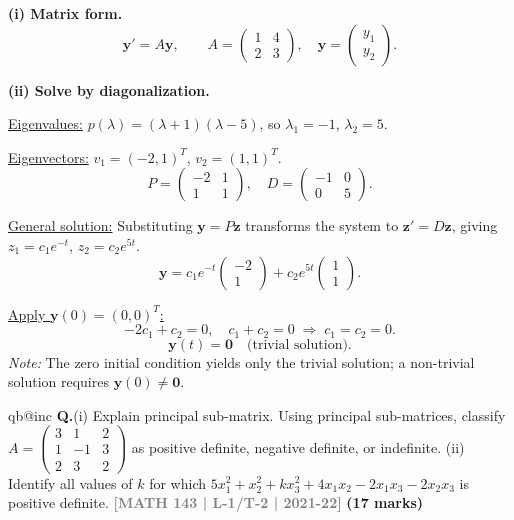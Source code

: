 \documentclass[12pt,a3paper]{article}
\makeatletter
\newcommand{\yr}[1]{\hfill\textcolor{gray}{\small\textbf{[#1]}}}
\newcommand{\mk}[1]{\textcolor{orange!70!black}{\small\textbf{(#1 marks)}}}
\newcounter{qnum}
\newcommand{\Q}[1]{%
  \csname qb@inc\endcsname
  \needspace{4\baselineskip}
  \refstepcounter{qnum}
  \vspace{6pt}
  \noindent\textbf{Q\theqnum.}\enspace #1\par
}
\makeatother
\begin{document}
\begin{tcolorbox}[enhanced,breakable,
  colback=cE!4,colframe=cE,boxrule=0.8pt,arc=5pt,
  title={\textbf{Answer --- ODE System via Diagonalization}},
  fonttitle=\bfseries\color{white},colbacktitle=cE]

\textbf{(i) Matrix form.}
\[
\mathbf{y}'=A\mathbf{y},\qquad A=\begin{pmatrix}1&4\\2&3\end{pmatrix},\quad\mathbf{y}=\begin{pmatrix}y_1\\y_2\end{pmatrix}.
\]

\textbf{(ii) Solve by diagonalization.}

\underline{Eigenvalues:} $p(\lambda)=(\lambda+1)(\lambda-5)$, so $\lambda_1=-1$, $\lambda_2=5$.

\underline{Eigenvectors:} $v_1=(-2,1)^T$, $v_2=(1,1)^T$.
\[
P=\begin{pmatrix}-2&1\\1&1\end{pmatrix},\quad D=\begin{pmatrix}-1&0\\0&5\end{pmatrix}.
\]

\underline{General solution:} Substituting $\mathbf{y}=P\mathbf{z}$ transforms the system to $\mathbf{z}'=D\mathbf{z}$, giving $z_1=c_1e^{-t}$, $z_2=c_2e^{5t}$.
\[
\mathbf{y}=c_1e^{-t}\begin{pmatrix}-2\\1\end{pmatrix}+c_2e^{5t}\begin{pmatrix}1\\1\end{pmatrix}.
\]

\underline{Apply $\mathbf{y}(0)=(0,0)^T$:}
\[
-2c_1+c_2=0,\quad c_1+c_2=0\;\Rightarrow\;c_1=c_2=0.
\]
\[
\boxed{\mathbf{y}(t)=\mathbf{0}\quad\text{(trivial solution).}}
\]
\textit{Note:} The zero initial condition yields only the trivial solution; a non-trivial solution requires $\mathbf{y}(0)\neq\mathbf{0}$.

\end{tcolorbox}

\Q{(i) Explain principal sub-matrix. Using principal sub-matrices, classify $A = \begin{pmatrix} 3 & 1 & 2 \\ 1 & -1 & 3 \\ 2 & 3 & 2 \end{pmatrix}$ as positive definite, negative definite, or indefinite. (ii) Identify all values of $k$ for which $5x_1^2 + x_2^2 + kx_3^2 + 4x_1x_2 - 2x_1x_3 - 2x_2x_3$ is positive definite.
\yr{MATH 143 | L-1/T-2 | 2021-22} \mk{17}}
\end{document}
